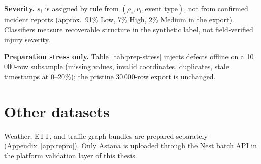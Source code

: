 \textbf{Severity.} $s_i$ is assigned by rule from $(\rho_i, v_i, \text{event type})$, not from confirmed incident reports (approx.\ 91\% Low, 7\% High, 2\% Medium in the export). Classifiers measure recoverable structure in the synthetic label, not field-verified injury severity.

\textbf{Preparation stress only.} Table~\ref{tab:prep-stress} injects defects offline on a 10\,000-row subsample (missing values, invalid coordinates, duplicates, stale timestamps at 0--20\%); the pristine 30\,000-row export is unchanged.

\section{Other datasets}

Weather, ETT, and traffic-graph bundles are prepared separately (Appendix~\ref{app:repro}). Only Astana is uploaded through the Nest batch API in the platform validation layer of this thesis.
